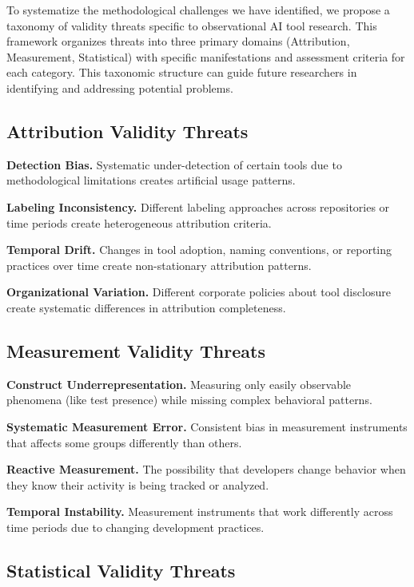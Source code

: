 \documentclass[conference]{IEEEtran}
\begin{document}
To systematize the methodological challenges we have identified, we propose a taxonomy of validity threats specific to observational AI tool research. This framework organizes threats into three primary domains (Attribution, Measurement, Statistical) with specific manifestations and assessment criteria for each category. This taxonomic structure can guide future researchers in identifying and addressing potential problems.

\subsection{Attribution Validity Threats}

\textbf{Detection Bias.} Systematic under-detection of certain tools due to methodological limitations creates artificial usage patterns.

\textbf{Labeling Inconsistency.} Different labeling approaches across repositories or time periods create heterogeneous attribution criteria.

\textbf{Temporal Drift.} Changes in tool adoption, naming conventions, or reporting practices over time create non-stationary attribution patterns.

\textbf{Organizational Variation.} Different corporate policies about tool disclosure create systematic differences in attribution completeness.

\subsection{Measurement Validity Threats}

\textbf{Construct Underrepresentation.} Measuring only easily observable phenomena (like test presence) while missing complex behavioral patterns.

\textbf{Systematic Measurement Error.} Consistent bias in measurement instruments that affects some groups differently than others.

\textbf{Reactive Measurement.} The possibility that developers change behavior when they know their activity is being tracked or analyzed.

\textbf{Temporal Instability.} Measurement instruments that work differently across time periods due to changing development practices.

\subsection{Statistical Validity Threats}
\end{document}
